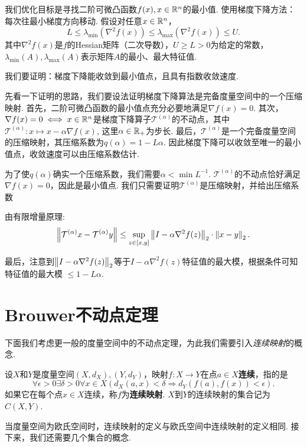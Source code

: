 \begin{example}[梯度下降的收敛性]
我们优化目标是寻找二阶可微凸函数$f(x),x\in \mathbb{R}^n$的最小值. 使用梯度下降方法：每次往最小梯度方向移动.
假设对任意$x\in \mathbb{R}^n$，
    \[L \le \lambda_{\min}(\nabla^2 f(x))\le \lambda_{\max}(\nabla^2 f(x))\le U.\]
    其中$\nabla^2f(x)$是$f$的Hessian矩阵（二次导数），$U\ge L>0$为给定的常数，$\lambda_{\min}(A),\lambda_{\max}(A)$表示矩阵$A$的最小、最大特征值.

我们要证明：梯度下降能收敛到最小值点，且具有指数收敛速度.

先看一下证明的思路，我们要设法证明梯度下降算法是完备度量空间中的一个压缩映射. 首先，二阶可微凸函数的最小值点充分必要地满足$\nabla f(x)=0$. 其次，$\nabla f(x)=0 \iff x\in\mathbb{R}^n$是梯度下降算子$\mathcal T^{(\alpha)}$的不动点，其中$\mathcal T^{(\alpha)}: x\mapsto x - \alpha\nabla f(x)$, 这里$\alpha\in \mathbb{R}_+$为步长. 最后，$\mathcal T^{(\alpha)}$是一个完备度量空间的压缩映射，其压缩系数为$q(\alpha)=1-L\alpha$. 因此梯度下降可以收敛至唯一的最小值点，收敛速度可以由压缩系数估计.

为了使$q(\alpha)$确实一个压缩系数，我们需要$\alpha<\min L^{-1}$. $\mathcal T^{(\alpha)}$的不动点恰好满足$\nabla f(x)=0$，因此是最小值点. 我们只需要证明$\mathcal T^{(\alpha)}$是压缩映射，并给出压缩系数

由有限增量原理:
    \[\left\|\mathcal T^{(\alpha)}x - \mathcal T^{(\alpha)}y\right\| \le \sup_{z\in[x,y]}\left\|I - \alpha \nabla^2 f(z)\right\|_2\cdot\left\|x-y\right\|_2.\]
    \item 最后，注意到$\left\|I-\alpha\nabla^2f(z)\right\|_2$等于$I-\alpha\nabla^2f(z)$特征值的最大模，根据条件可知特征值的最大模 $\leq 1-L\alpha$.
\end{example}

\section{Brouwer不动点定理}
下面我们考虑更一般的度量空间中的不动点定理，为此我们需要引入\emph{连续映射}的概念. 

\begin{definition}
设$X$和$Y$是度量空间$(X,d_X),(Y,d_Y)$，映射$f:X\to Y$在点$a\in X$\textbf{连续}，指的是
    \[\forall\epsilon>0\exists\delta>0\forall x\in X(d_X(a,x) < \delta\Rightarrow d_Y(f(a),f(x))<\epsilon).\]
如果它在每个点$x\in X$连续，称$f$为\textbf{连续映射}. $X$到$Y$的连续映射的集合记为$C(X,Y)$. 
\end{definition}

当度量空间为欧氏空间时，连续映射的定义与欧氏空间中连续映射的定义相同. 接下来，我们还需要几个集合的概念. 

